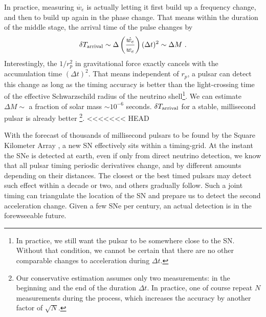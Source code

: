 \documentclass[aps,showpacs,twocolumn,floats,prd,superscriptaddress,nofootinbib]{revtex4-1}
\begin{document}
In practice, measuring $\dot{w_e}$ is actually letting it first build up a frequency change, and then to build up again in the phase change. That means within the duration of the middle stage, the arrival time of the pulse changes by 
\begin{equation}
\delta T_{\rm arrival} \sim \Delta\left(\frac{\dot{w_e}}{w_e}\right)(\Delta t)^2
\sim \Delta M~.
\end{equation}
Interestingly, the $1/r_p^2$ in gravitational force exactly cancels with the accumulation time $(\Delta t)^2$. That means independent of $r_p$, a pulsar can detect this change as long as the timing accuracy is better than the light-crossing time of the effective Schwarzschild radius of the neutrino shell\footnote{In practice, we still want the pulsar to be somewhere close to the SN. Without that condition, we cannot be certain that there are no other comparable changes to acceleration during $\Delta t$.}. We can estimate $\Delta M\sim$ a fraction of solar mass $\sim10^{-6}$ seconds. $\delta T_{\rm arrival}$ for a stable, millisecond pulsar is already better \cite{PulsarTiming}\footnote{Our conservative estimation assumes only two measurements: in the beginning and the end of the duration $\Delta t$. In practice, one of course repeat $N$ measurements during the process, which increases the accuracy by another factor of $\sqrt{N}$.}.
<<<<<<< HEAD

With the forecast of thousands of millisecond pulsars to be found by the Square Kilometer Array \cite{SKA}, a new SN effectively sits within a timing-grid. At the instant the SNe is detected at earth, even if only from direct neutrino detection, we know that all pulsar timing periodic derivatives change, and by different amounts depending on their distances. The closest or the best timed pulsars may detect such effect within a decade or two, and others gradually follow. Such a joint timing can triangulate the location of the SN and prepare us to detect the second acceleration change. Given a few SNe per century\cite{SNrate06}, an actual detection is in the forewseeable future.

\end{document}
